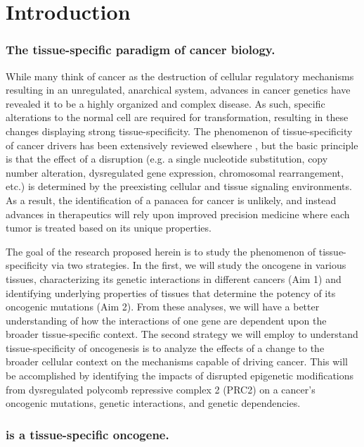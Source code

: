 \chapter{Introduction}

\subsection*{The tissue-specific paradigm of cancer biology.}

While many think of cancer as the destruction of cellular regulatory mechanisms resulting in an unregulated, anarchical system, advances in cancer genetics have revealed it to be a highly organized and complex disease.
As such, specific alterations to the normal cell are required for transformation, resulting in these changes displaying strong tissue-specificity.
The phenomenon of tissue-specificity of cancer drivers has been extensively reviewed elsewhere \cite{Sieber2005TissueCancers., Schneider2017, Haigis2019}, but the basic principle is that the effect of a disruption (e.g. a single nucleotide substitution, copy number alteration, dysregulated gene expression, chromosomal rearrangement, etc.) is determined by the preexisting cellular and tissue signaling environments.
As a result, the identification of a panacea for cancer is unlikely, and instead advances in therapeutics will rely upon improved precision medicine where each tumor is treated based on its unique properties.

The goal of the research proposed herein is to study the phenomenon of tissue-specificity via two strategies.
In the first, we will study the oncogene \KRAS{} in various tissues, characterizing its genetic interactions in different cancers (Aim 1) and identifying underlying properties of tissues that determine the potency of its oncogenic mutations (Aim 2).
From these analyses, we will have a better understanding of how the interactions of one gene are dependent upon the broader tissue-specific context.
The second strategy we will employ to understand tissue-specificity of oncogenesis is to analyze the effects of a change to the broader cellular context on the mechanisms capable of driving cancer.
This will be accomplished by identifying the impacts of disrupted epigenetic modifications from dysregulated polycomb repressive complex 2 (PRC2) on a cancer's oncogenic mutations, genetic interactions, and genetic dependencies.


\subsection*{\KRAS{} is a tissue-specific oncogene.}

